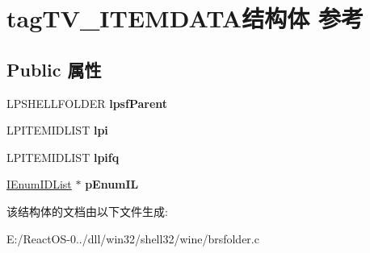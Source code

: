 \hypertarget{structtag_t_v___i_t_e_m_d_a_t_a}{}\section{tag\+T\+V\+\_\+\+I\+T\+E\+M\+D\+A\+T\+A结构体 参考}
\label{structtag_t_v___i_t_e_m_d_a_t_a}
\subsection*{Public 属性}
\begin{DoxyCompactItemize}
\item 
\mbox{\label{structtag_t_v___i_t_e_m_d_a_t_a_a8aad4b35a77a8959bdc81b49b475fb1f}} 
L\+P\+S\+H\+E\+L\+L\+F\+O\+L\+D\+ER {\bfseries lpsf\+Parent}
\item 
\mbox{\label{structtag_t_v___i_t_e_m_d_a_t_a_ad96a0668acc762b0a4a115a4c1f634b3}} 
L\+P\+I\+T\+E\+M\+I\+D\+L\+I\+ST {\bfseries lpi}
\item 
\mbox{\label{structtag_t_v___i_t_e_m_d_a_t_a_a398f74a4d9511b959efc2c5f63745ba6}} 
L\+P\+I\+T\+E\+M\+I\+D\+L\+I\+ST {\bfseries lpifq}
\item 
\mbox{\label{structtag_t_v___i_t_e_m_d_a_t_a_a92d44db4d2d57575e9a703e0e2e787a1}} 
\hyperlink{interface_i_enum_i_d_list}{I\+Enum\+I\+D\+List} $\ast$ {\bfseries p\+Enum\+IL}
\end{DoxyCompactItemize}


该结构体的文档由以下文件生成\+:\begin{DoxyCompactItemize}
\item 
E\+:/\+React\+O\+S-\/0../dll/win32/shell32/wine/brsfolder.\+c\end{DoxyCompactItemize}
